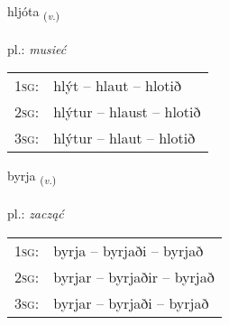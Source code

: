 \documentclass[frontgrid, backgrid]{flacards}\usepackage[]{graphicx}\usepackage[]{xcolor}
\begin{document}
\renewcommand{\blhead}{\vskip5pt {\small\bfseries\footnotesize Sagnorð | Verb }}
\renewcommand{\bcfoot}{\vskip5pt \hspace{2pt}{\small\bfseries\footnotesize 1K}}


{hljóta \small{\textsubscript{(\textit{v.})}} \\[1ex] %
\textphonetic{[l̥jouːta]} \\
pl.: \emph{musieć} \\  [2ex]
\renewcommand*{\arraystretch}{0.8}
\begin{tabular}{p{1cm}l}
\textsc{1sg}: & hlýt -- hlaut -- hlotið \\ 
\textsc{2sg}: & hlýtur -- hlaust -- hlotið \\ 
\textsc{3sg}: & hlýtur -- hlaut -- hlotið \\ 
\end{tabular}
}

\renewcommand{\flhead}{\vskip5pt \fboxsep=0pt {\small\bfseries\footnotesize Sagnorð | Verb}}
\renewcommand{\fcfoot}{\vskip5pt \fboxsep=0pt \hspace{2pt}{\small\bfseries\footnotesize 1K}}

\renewcommand{\blhead}{\vskip5pt {\small\bfseries\footnotesize Sagnorð | Verb }}
\renewcommand{\bcfoot}{\vskip5pt \hspace{2pt}{\small\bfseries\footnotesize 1K}}


{byrja \small{\textsubscript{(\textit{v.})}} \\[1ex] %
\textphonetic{[pɪrja]} \\
pl.: \emph{zacząć} \\  [2ex]
\renewcommand*{\arraystretch}{0.8}
\begin{tabular}{p{1cm}l}
\textsc{1sg}: & byrja -- byrjaði -- byrjað \\ 
\textsc{2sg}: & byrjar -- byrjaðir -- byrjað \\ 
\textsc{3sg}: & byrjar -- byrjaði -- byrjað \\ 
\end{tabular}
}
\end{document}
